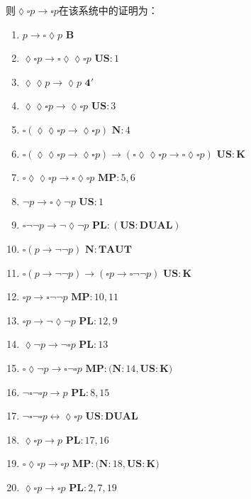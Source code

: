 \documentclass{article}
\begin{document}
则$\lozenge \square p \rightarrow \square p$在该系统中的证明为：
\begin{enumerate}
  \item $p \rightarrow \square \lozenge p$ \hfill $\mathbf{B}$
  \item $\lozenge \square p \rightarrow \square \lozenge \lozenge \square p$ \hfill $\mathbf{US}: 1$
  \item $\lozenge \lozenge p \rightarrow \lozenge p$ \hfill $\mathbf{4'}$
  \item $\lozenge \lozenge \square p \rightarrow \lozenge \square p$ \hfill $\mathbf{US}: 3$
  \item $\square(\lozenge \lozenge \square p \rightarrow \lozenge \square p)$ \hfill $\mathbf{N}: 4$

  \item $\square(\lozenge \lozenge \square p \rightarrow \lozenge \square p) \rightarrow (\square \lozenge \lozenge \square p \rightarrow \square \lozenge \square p)$ \hfill $\mathbf{US: K}$
  \item $\square \lozenge \lozenge \square p \rightarrow \square \lozenge \square p$ \hfill $\mathbf{MP}: 5, 6$
  \item $\neg p \rightarrow \square \lozenge \neg p$ \hfill $\mathbf{US}: 1$
  \item $\square \neg \neg p \rightarrow \neg \lozenge \neg p$ \hfill $\mathbf{PL: (US: DUAL)}$
  \item $\square (p \rightarrow \neg \neg p)$ \hfill $\mathbf{N: TAUT}$

  \item $\square (p \rightarrow \neg \neg p) \rightarrow (\square p \rightarrow \square \neg \neg p)$ \hfill $\mathbf{US: K}$
  \item $\square p \rightarrow \square \neg \neg p$ \hfill $\mathbf{MP}: 10, 11$
  \item $\square p \rightarrow \neg \lozenge \neg p$ \hfill $\mathbf{PL}: 12, 9$
  \item $\lozenge \neg p \rightarrow \neg \square p$ \hfill $\mathbf{PL}: 13$
  \item $\square \lozenge \neg p \rightarrow \square \neg \square p$ \hfill $\mathbf{MP:(N}: 14 \mathbf{, US:K)}$

  \item $\neg \square \neg \square p \rightarrow p$ \hfill $\mathbf{PL}: 8, 15$
  \item $\neg \square \neg \square p \leftrightarrow \lozenge \square p$ \hfill $\mathbf{US: DUAL}$
  \item $\lozenge \square p \rightarrow p$ \hfill $\mathbf{PL}: 17, 16$
  \item $\square \lozenge \square p \rightarrow \square p$ \hfill $\mathbf{MP:(N}: 18 \mathbf{, US:K)}$
  \item $\lozenge \square p \rightarrow \square p$ \hfill $\mathbf{PL}: 2, 7, 19$
\end{enumerate}
\end{document}
